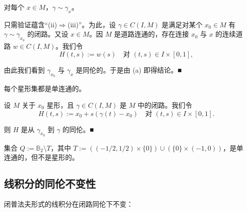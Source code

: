 \begin{remark}
\begin{items}
\begin{subitems}
对每个 $ x \in M $，$ \gamma \sim \gamma_{x} $。

\proofhead
只需验证蕴含“(ii)$ \Rightarrow $(iii)”。为此，设 $ \gamma \in C(I,M) $ 是满足对某个 $ x_{0} \in M $ 有 $ \gamma \sim \gamma_{x_{0}} $ 的闭路。又设 $ x \in M $。因 $ M $ 是道路连通的，存在连接 $ x_{0} $ 与 $ x $ 的连续道路 $ w \in C(I,M) $。我们令
\[
H(t,s) := w(s) \quad \text{对 } (t,s) \in I\times[0,1] ,
\]

由此我们看到 $ \gamma_{x_{0}} $ 与 $ \gamma_{x} $ 是同伦的。于是由 (a) 即得结论。\nobreak\hspace{0.35em}■

\end{subitems}

\item

每个星形集都是单连通的。

\proofhead
设 $ M $ 关于 $ x_{0} $ 星形，且 $ \gamma \in C(I,M) $ 是 $ M $ 中的闭路。我们令
\[
H(t,s) := x_{0} + s\left(\gamma(t) - x_{0}\right) \quad \text{对 } (t,s) \in I\times[0,1] .
\]

则 $ H $ 是从 $ \gamma_{x_{0}} $ 到 $ \gamma $ 的同伦。\nobreak\hspace{0.35em}■

\item

集合 $ Q := \mathbb{B}_{2}\setminus T $，其中 $ T := \left((-1/2,1/2)\times\{0\}\right)\cup\left(\{0\}\times(-1,0)\right) $，是单连通的，但不是星形的。

\end{items}

\end{remark}

\subsection*{线积分的同伦不变性}

闭普法夫形式的线积分在闭路同伦下不变：

